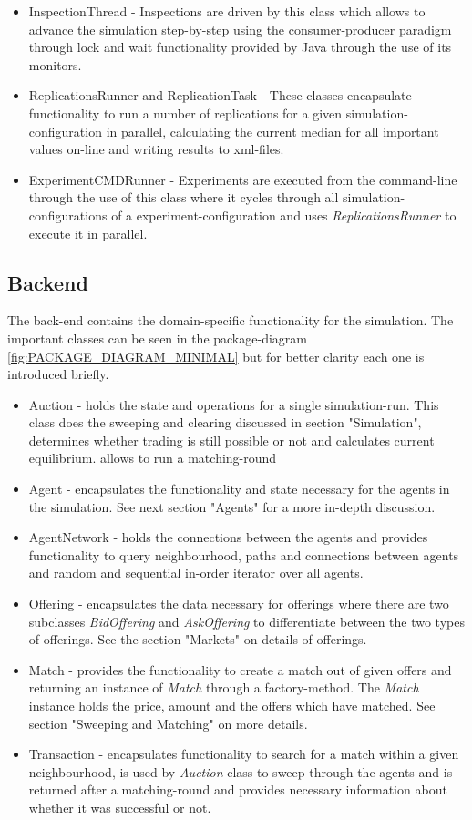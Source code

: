 \documentclass[Bachelorarbeit.tex]{subfiles}
\begin{document}
\begin{itemize}
\item InspectionThread - Inspections are driven by this class which allows to advance the simulation step-by-step using the consumer-producer paradigm through lock and wait functionality provided by Java through the use of its monitors.
\item ReplicationsRunner and ReplicationTask - These classes encapsulate functionality to run a number of replications for a given simulation-configuration in parallel, calculating the current median for all important values on-line and writing results to xml-files.
\item ExperimentCMDRunner - Experiments are executed from the command-line through the use of this class where it cycles through all simulation-configurations of a experiment-configuration and uses \textit{ReplicationsRunner} to execute it in parallel. 
\end{itemize}

\subsection{Backend}
The back-end contains the domain-specific functionality for the simulation. The important classes can be seen in the package-diagram \ref{fig:PACKAGE_DIAGRAM_MINIMAL} but for better clarity each one is introduced briefly.

\begin{itemize}
\item Auction - holds the state and operations for a single simulation-run. This class does the sweeping and clearing discussed in section "Simulation", determines whether trading is still possible or not and calculates current equilibrium.  allows to run a matching-round
\item Agent - encapsulates the functionality and state necessary for the agents in the simulation. See next section "Agents" for a more in-depth discussion.
\item AgentNetwork - holds the connections between the agents and provides functionality to query neighbourhood, paths and connections between agents and random and sequential in-order iterator over all agents.
\item Offering - encapsulates the data necessary for offerings where there are two subclasses \textit{BidOffering} and \textit{AskOffering} to differentiate between the two types of offerings. See the section "Markets" on details of offerings.
\item Match - provides the functionality to create a match out of given offers and returning an instance of \textit{Match} through a factory-method. The \textit{Match} instance holds the price, amount and the offers which have matched. See section "Sweeping and Matching" on more details.
\item Transaction - encapsulates functionality to search for a match within a given neighbourhood, is used by \textit{Auction} class to sweep through the agents and is returned after a matching-round and provides necessary information about whether it was successful or not.
\end{itemize}
\end{document}
